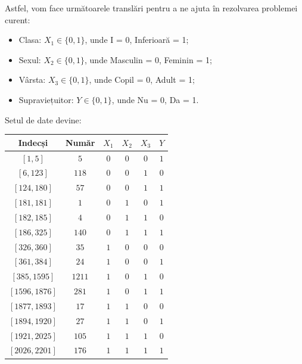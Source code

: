 \documentclass{article}
\begin{document}
\noindent Astfel, vom face următoarele translări pentru a ne ajuta în rezolvarea problemei curent:
\begin{itemize}
    \item Clasa: \( X_1 \in \{0, 1\} \), unde I = 0, Inferioară = 1;
    \item Sexul: \( X_2 \in \{0, 1\} \), unde Masculin = 0, Feminin = 1;
    \item Vârsta: \( X_3 \in \{0, 1\} \), unde Copil = 0, Adult = 1;
    \item Supraviețuitor: \( Y \in \{0, 1\} \), unde Nu = 0, Da = 1.
\end{itemize}

Setul de date devine:

\begin{tabular}{|c|c|c|c|c|c|}
    \hline
    Indecși & Număr & \( X_1 \) & \( X_2 \) & \( X_3 \) & \( Y \) \\ \hline
    \( [1, 5] \) & \( 5 \) & \( 0 \) & \( 0 \) & \( 0 \) & \( 1 \) \\ \hline
    \( [6, 123] \) & \( 118 \) & \( 0 \) & \( 0 \) & \( 1 \) & \( 0 \) \\ \hline
    \( [124, 180] \) & \( 57 \) & \( 0 \) & \( 0 \) & \( 1 \) & \( 1 \) \\ \hline
    \( [181, 181] \) & \( 1 \) & \( 0 \) & \( 1 \) & \( 0 \) & \( 1 \) \\ \hline
    \( [182, 185] \) & \( 4 \) & \( 0 \) & \( 1 \) & \( 1 \) & \( 0 \) \\ \hline
    \( [186, 325] \) & \( 140 \) & \( 0 \) & \( 1 \) & \( 1 \) & \( 1 \) \\ \hline
    \( [326, 360] \) & \( 35 \) & \( 1 \) & \( 0 \) & \( 0 \) & \( 0 \) \\ \hline
    \( [361, 384] \) & \( 24 \) & \( 1 \) & \( 0 \) & \( 0 \) & \( 1 \) \\ \hline
    \( [385, 1595] \) & \( 1211 \) & \( 1 \) & \( 0 \) & \( 1 \) & \( 0 \) \\ \hline
    \( [1596, 1876] \) & \( 281 \) & \( 1 \) & \( 0 \) & \( 1 \) & \( 1 \) \\ \hline
    \( [1877, 1893] \) & \( 17 \) & \( 1 \) & \( 1 \) & \( 0 \) & \( 0 \) \\ \hline
    \( [1894, 1920] \) & \( 27 \) & \( 1 \) & \( 1 \) & \( 0 \) & \( 1 \) \\ \hline
    \( [1921, 2025] \) & \( 105 \) & \( 1 \) & \( 1 \) & \( 1 \) & \( 0 \) \\ \hline
    \( [2026, 2201] \) & \( 176 \) & \( 1 \) & \( 1 \) & \( 1 \) & \( 1 \) \\ \hline
\end{tabular}
\end{document}
